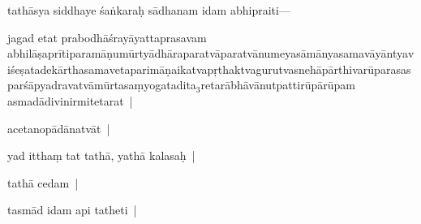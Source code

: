 \documentclass[article,12pt,a4paper]{memoir}%
\newcounter{parCount}
\begin{document}
	  
	  \pstart \leavevmode%
	\label{thakur75-39.1}\label{sarit__ratnakīrtinibandhāvali__102493}tathāsya siddhaye śaṅkaraḥ sādhanam idam abhipraiti—
	{}
	\pend%
      

	  
	  \pstart \leavevmode%
	jagad etat prabodhāśrayāyattaprasavam \label{rnā__102330}abhilāṣa\label{rnā__102368}prītiparamāṇumūrtyādhāraparatvāparatvānumeyasāmānyasamavāyāntyaviśeṣatadekārthasamavetaparimāṇaikatvapṛthaktvagurutvasnehāpārthivarūparasasparśāpyadravatvāmūrtasaṃyogatadita{\tiny $_{3}$}retarābhāvānutpattirūpārūpam asmadādivinirmitetarat |
	{}
	\pend%
      

	  
	  \pstart \leavevmode%
	acetanopādānatvāt |
	{}
	\pend%
      

	  
	  \pstart \leavevmode%
	yad itthaṃ tat tathā, yathā kalasaḥ |
	{}
	\pend%
      

	  
	  \pstart \leavevmode%
	tathā cedam |
	{}
	\pend%
      

	  
	  \pstart \leavevmode%
	tasmād idam api tatheti |\label{sarit__ratnakīrtinibandhāvali__103091}
	{}
	\pend%
      
\end{document}
